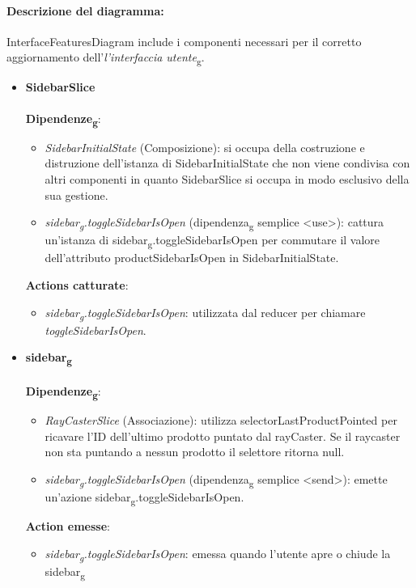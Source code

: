 \paragraph*{Descrizione del diagramma:}
InterfaceFeaturesDiagram include i componenti necessari per il corretto aggiornamento dell'\textit{l'interfaccia 
		utente}\textsubscript{g}.
\begin{itemize}
		\item \textbf{SidebarSlice}
		\\\\
		\textbf{Dipendenze\textsubscript{g}}:
		\begin{itemize}
			\item \textit{SidebarInitialState} (Composizione): si occupa della costruzione e distruzione dell'istanza di SidebarInitialState
			che non viene condivisa con altri componenti in quanto SidebarSlice si occupa in modo esclusivo della sua gestione.
			\item \textit{sidebar\textsubscript{g}.toggleSidebarIsOpen} (dipendenza\textsubscript{g} semplice \textless use\textgreater): cattura un'istanza di sidebar\textsubscript{g}.toggleSidebarIsOpen
			per commutare il valore dell'attributo productSidebarIsOpen in SidebarInitialState.
		\end{itemize}
		\textbf{Actions catturate}:
		\begin{itemize}
			\item \textit{sidebar\textsubscript{g}.toggleSidebarIsOpen}: utilizzata dal reducer per chiamare \textit{toggleSidebarIsOpen}.
		\end{itemize}
		\item \textbf{sidebar\textsubscript{g}}
		\\\\
		\textbf{Dipendenze\textsubscript{g}}:
		\begin{itemize}
			\item \textit{RayCasterSlice} (Associazione): utilizza selectorLastProductPointed per ricavare l'ID dell'ultimo 
			prodotto puntato dal rayCaster. Se il raycaster non sta puntando a nessun prodotto il selettore ritorna null.
			\item \textit{sidebar\textsubscript{g}.toggleSidebarIsOpen} (dipendenza\textsubscript{g} semplice \textless send\textgreater): emette un'azione
			sidebar\textsubscript{g}.toggleSidebarIsOpen.
		\end{itemize}
		\textbf{Action emesse}:
		\begin{itemize}
			\item \textit{sidebar\textsubscript{g}.toggleSidebarIsOpen}: emessa quando l'utente apre o chiude la sidebar\textsubscript{g}

\end{itemize}
\end{itemize}

